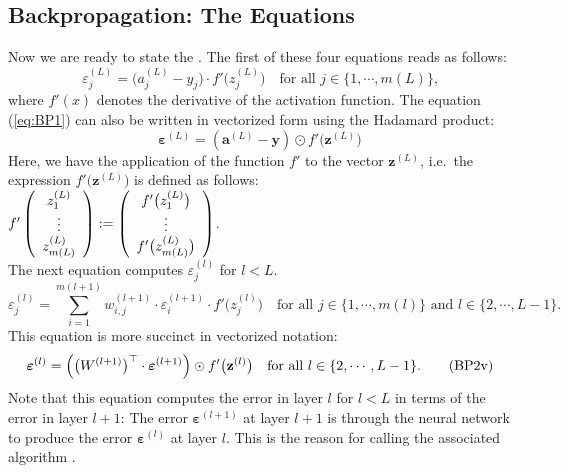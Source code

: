 \subsection{Backpropagation: The Equations}
Now we are ready to state the .  
The first of these four equations reads as follows:
\begin{equation}
  \label{eq:BP1}
  \varepsilon^{(L)}_j = \bigl(a_j^{(L)} - y_j\bigr) \cdot f'\bigl(z_j^{(L)}\bigr)
 \quad \mbox{for all $j \in \{1, \cdots, m(L)\}$,}
  \tag{BP1}
\end{equation}
where $f'(x)$ denotes the derivative of the activation function.  
The equation (\ref{eq:BP1}) can also be written in vectorized form using the Hadamard product:
\begin{equation}
  \label{eq:BP1s}
\boldsymbol{\varepsilon}^{(L)} = (\mathbf{a}^{(L)} - \mathbf{y}) \odot f'\bigl(\mathbf{z}^{(L)}\bigr)  
\tag{BP1v}
\end{equation}
Here, we have  the application of the function $f'$ to the vector $\mathbf{z}^{(L)}$, i.e.~the
expression $f'\bigl(\mathbf{z}^{(L)}\bigr)$ is defined as follows:
\\[0.2cm]
\hspace*{1.3cm}
$ f'\left(
  \begin{array}[c]{c}
   z_1^{(L)}      \\
   \vdots       \\
   z_{m(L)}^{(L)} 
  \end{array}
  \right) := \left(
  \begin{array}[c]{c}
   f'\bigl(z_1^{(L)}\bigr)      \\
   \vdots       \\
   f'\bigl(z_{m(L)}^{(L)}\bigr)
  \end{array}
  \right)
$.
\\[0.2cm]
The next equation computes $\varepsilon_j^{(l)}$ for $l < L$.  
\begin{equation}
  \label{eq:BP2}
  \varepsilon^{(l)}_j = \sum\limits_{i=1}^{m(l+1)} w_{i,j}^{(l+1)} \cdot \varepsilon^{(l+1)}_i \cdot
  f'\bigl(z^{(l)}_j\bigr) \quad \mbox{for all $j \in \{1, \cdots, m(l)\}$ and $l \in \{2, \cdots, L-1\}$}.
  \tag{BP2}
\end{equation}
This equation is more succinct in vectorized notation:
\begin{equation}
  \label{eq:BP2v}
  \boldsymbol{\varepsilon}^{(l)} = \Bigl(\bigl(W^{(l+1)}\bigr)^\top \cdot \boldsymbol{\varepsilon}^{(l+1)}\Bigr) \odot
  f'\bigl(\mathbf{z}^{(l)}\bigr) \quad \mbox{for all $l \in \{2, \cdots, L-1\}$}.
  \tag{BP2v}
\end{equation}
Note that this equation computes the error in layer $l$ for $l < L$ in terms
of the error in layer $l+1$:  The error 
$\boldsymbol{\varepsilon}^{(l+1)}$ at layer $l+1$ is  through the neural network to produce the
error $\boldsymbol{\varepsilon}^{(l)}$ at layer $l$.  This is the reason for calling the associated algorithm
.  


